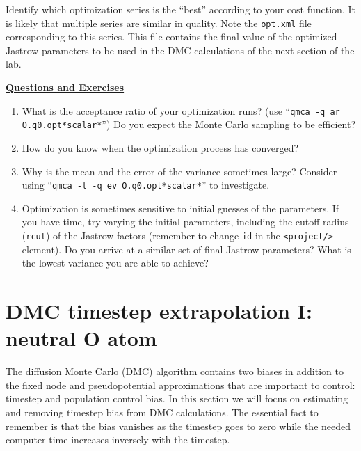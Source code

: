 Identify which optimization series is the ``best'' according to your cost function.  It is likely that multiple series are similar in quality.  Note the \texttt{opt.xml} file corresponding to this series.  This file contains the final value of the optimized Jastrow parameters to be used in the DMC calculations of the next section of the lab.  

\vspace{1cm}
\begin{flushleft}
\textbf{\underline{Questions and Exercises}}
\end{flushleft}
\begin{enumerate}
  \item{What is the acceptance ratio of your optimization runs? (use ``\verb|qmca -q ar O.q0.opt*scalar*|'')  Do you expect the Monte Carlo sampling to be efficient?}
  \item{How do you know when the optimization process has converged?}
  \item{Why is the mean and the error of the variance sometimes large?  Consider using \newline``\verb|qmca -t -q ev O.q0.opt*scalar*|'' to investigate.}
  \item{Optimization is sometimes sensitive to initial guesses of the parameters.  If you have time, try varying the initial parameters, including the cutoff radius (\texttt{rcut}) of the Jastrow factors (remember to change \texttt{id} in the \texttt{<project/>} element).  Do you arrive at a similar set of final Jastrow parameters?  What is the lowest variance you are able to achieve?}
\end{enumerate}



\section{DMC timestep extrapolation I: neutral O atom}
The diffusion Monte Carlo (DMC) algorithm contains two biases in addition to the fixed node and pseudopotential approximations that are important to control: timestep and population control bias.  In this section we will focus on estimating and removing timestep bias from DMC calculations.  The essential fact to remember is that the bias vanishes as the timestep goes to zero while the needed computer time increases inversely with the timestep.   


